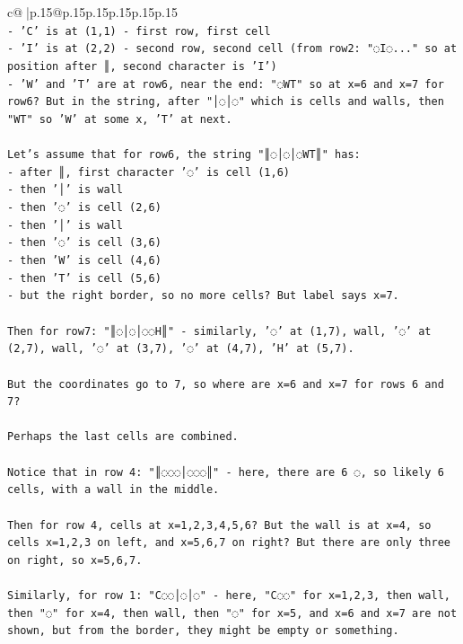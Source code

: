 \documentclass{article}
\begin{document}
{\begin{supertabular}{c@{$\;$}|p{.15\linewidth}@{}p{.15\linewidth}p{.15\linewidth}p{.15\linewidth}p{.15\linewidth}p{.15\linewidth}}
{{{\\ 
\texttt{{-} 'C' is at (1,1) {-} first row, first cell} \\
\texttt{{-} 'I' is at (2,2) {-} second row, second cell (from row2: "◌I◌..." so at position after ║, second character is 'I')} \\
\texttt{{-} 'W' and 'T' are at row6, near the end: "◌WT" so at x=6 and x=7 for row6? But in the string, after "│◌│◌" which is cells and walls, then "WT" so 'W' at some x, 'T' at next.} \\
\\ 
\texttt{Let's assume that for row6, the string "║◌│◌│◌WT║" has:} \\
\texttt{{-} after ║, first character '◌' is cell (1,6)} \\
\texttt{{-} then '│' is wall} \\
\texttt{{-} then '◌' is cell (2,6)} \\
\texttt{{-} then '│' is wall} \\
\texttt{{-} then '◌' is cell (3,6)} \\
\texttt{{-} then 'W' is cell (4,6)} \\
\texttt{{-} then 'T' is cell (5,6)} \\
\texttt{{-} but the right border, so no more cells? But label says x=7.} \\
\\ 
\texttt{Then for row7: "║◌│◌│◌◌H║" {-} similarly, '◌' at (1,7), wall, '◌' at (2,7), wall, '◌' at (3,7), '◌' at (4,7), 'H' at (5,7).} \\
\\ 
\texttt{But the coordinates go to 7, so where are x=6 and x=7 for rows 6 and 7?} \\
\\ 
\texttt{Perhaps the last cells are combined.} \\
\\ 
\texttt{Notice that in row 4: "║◌◌◌│◌◌◌║" {-} here, there are 6 ◌, so likely 6 cells, with a wall in the middle.} \\
\\ 
\texttt{Then for row 4, cells at x=1,2,3,4,5,6? But the wall is at x=4, so cells x=1,2,3 on left, and x=5,6,7 on right? But there are only three on right, so x=5,6,7.} \\
\\ 
\texttt{Similarly, for row 1: "C◌◌│◌│◌" {-} here, "C◌◌" for x=1,2,3, then wall, then "◌" for x=4, then wall, then "◌" for x=5, and x=6 and x=7 are not shown, but from the border, they might be empty or something.} \\
}}}
\end{supertabular}}
\end{document}

